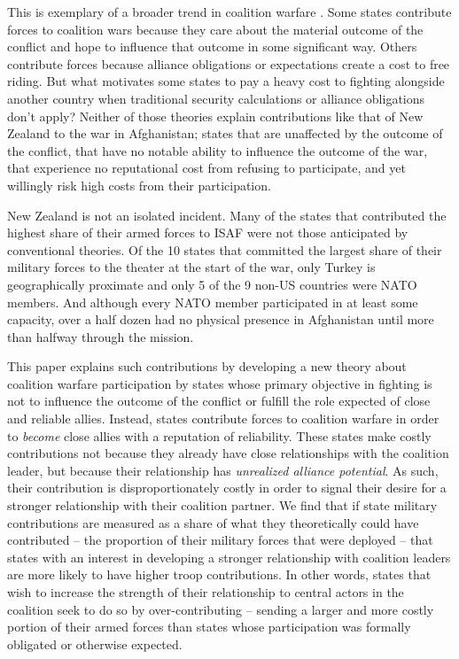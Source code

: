 \documentclass[12pt,letterpaper]{article}
\begin{document}
	This is exemplary of a broader trend in coalition warfare \citep{vonhlatky_greatasymmetryamerica_2010}. Some states contribute forces to coalition wars because they care about the material outcome of the conflict and hope to influence that outcome in some significant way. Others contribute forces because alliance obligations or expectations create a cost to free riding. But what motivates some states to pay a heavy cost to fighting alongside another country when traditional security calculations or alliance obligations don't apply? Neither of those theories explain contributions like that of New Zealand to the war in Afghanistan; states that are unaffected by the outcome of the conflict, that have no notable ability to influence the outcome of the war, that experience no reputational cost from refusing to participate, and yet willingly risk high costs from their participation.
	
	New Zealand is not an isolated incident. Many of the states that contributed the highest share of their armed forces to ISAF were not those anticipated by conventional theories. Of the 10 states that committed the largest share of their military forces to the theater at the start of the war, only Turkey is geographically proximate and only 5 of the 9 non-US countries were NATO members. And although every NATO member participated in at least some capacity, over a half dozen had no physical presence in Afghanistan until more than halfway through the mission.

	This paper explains such contributions by developing a new theory about coalition warfare participation by states whose primary objective in fighting is not to influence the outcome of the conflict or fulfill the role expected of close and reliable allies. Instead, states contribute forces to coalition warfare in order to \textit{become} close allies with a reputation of reliability. These states make costly contributions not because they already have close relationships with the coalition leader, but because their relationship has \textit{unrealized alliance potential}. As such, their contribution is disproportionately costly in order to signal their desire for a stronger relationship with their coalition partner. We find that if state military contributions are measured as a share of what they theoretically could have contributed -- the proportion of their military forces that were deployed -- that states with an interest in developing a stronger relationship with coalition leaders are more likely to have higher troop contributions. In other words, states that wish to increase the strength of their relationship to central actors in the coalition seek to do so by over-contributing -- sending a larger and more costly portion of their armed forces than states whose participation was formally obligated or otherwise expected.
	
\end{document}
